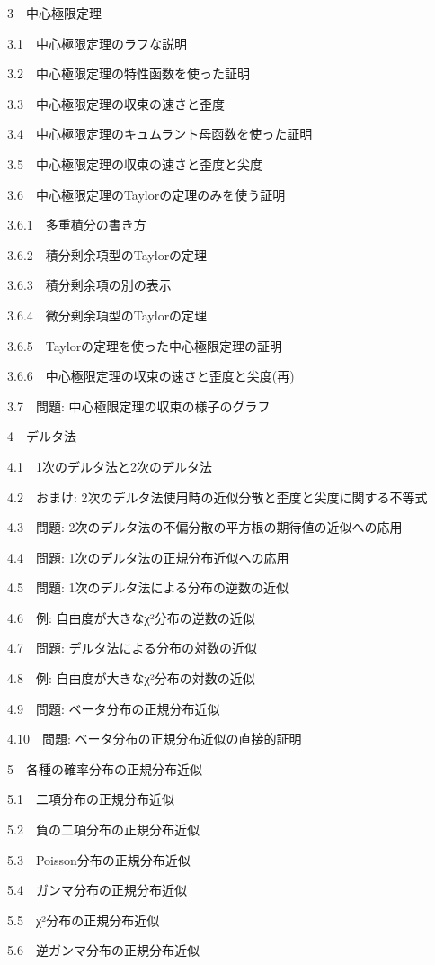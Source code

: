 \documentclass[
  letterpaper,
  DIV=11,
  numbers=noendperiod]{scrartcl}
\begin{document}
{{3~~}中心極限定理}

{{3.1~~}中心極限定理のラフな説明}

{{3.2~~}中心極限定理の特性函数を使った証明}

{{3.3~~}中心極限定理の収束の速さと歪度}

{{3.4~~}中心極限定理のキュムラント母函数を使った証明}

{{3.5~~}中心極限定理の収束の速さと歪度と尖度}

{{3.6~~}中心極限定理のTaylorの定理のみを使う証明}

{{3.6.1~~}多重積分の書き方}

{{3.6.2~~}積分剰余項型のTaylorの定理}

{{3.6.3~~}積分剰余項の別の表示}

{{3.6.4~~}微分剰余項型のTaylorの定理}

{{3.6.5~~}Taylorの定理を使った中心極限定理の証明}

{{3.6.6~~}中心極限定理の収束の速さと歪度と尖度(再)}

{{3.7~~}問題: 中心極限定理の収束の様子のグラフ}

{{4~~}デルタ法}

{{4.1~~}1次のデルタ法と2次のデルタ法}

{{4.2~~}おまけ: 2次のデルタ法使用時の近似分散と歪度と尖度に関する不等式}

{{4.3~~}問題: 2次のデルタ法の不偏分散の平方根の期待値の近似への応用}

{{4.4~~}問題: 1次のデルタ法の正規分布近似への応用}

{{4.5~~}問題: 1次のデルタ法による分布の逆数の近似}

{{4.6~~}例: 自由度が大きなχ²分布の逆数の近似}

{{4.7~~}問題: デルタ法による分布の対数の近似}

{{4.8~~}例: 自由度が大きなχ²分布の対数の近似}

{{4.9~~}問題: ベータ分布の正規分布近似}

{{4.10~~}問題: ベータ分布の正規分布近似の直接的証明}

{{5~~}各種の確率分布の正規分布近似}

{{5.1~~}二項分布の正規分布近似}

{{5.2~~}負の二項分布の正規分布近似}

{{5.3~~}Poisson分布の正規分布近似}

{{5.4~~}ガンマ分布の正規分布近似}

{{5.5~~}χ²分布の正規分布近似}

{{5.6~~}逆ガンマ分布の正規分布近似}
\end{document}
